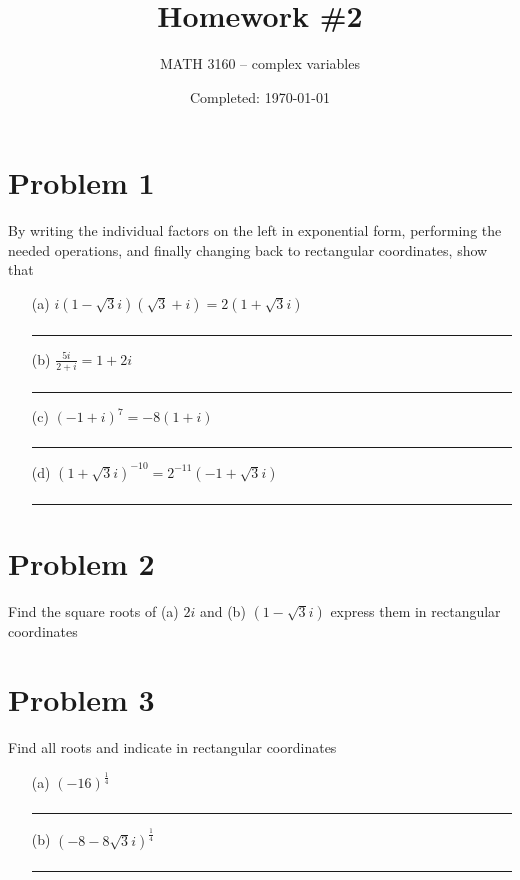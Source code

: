 \documentclass{article}
\title{Homework \#2}
\author{
  MATH 3160 -- complex variables\\
  \myauthor
}
\date{Completed: \today}
\begin{document}
\maketitle %


\section*{Problem 1}
By writing the individual factors on the left in exponential form, performing the needed
operations, and finally changing back to rectangular coordinates, show that

\begin{enumerate}
\item[(a)] $i(1-\sqrt{3}i)(\sqrt{3} + i) = 2(1 + \sqrt{3}i)$
  \begin{align*}
  \end{align*}
\hrule
\item[(b)] $\frac{5i}{2+i} = 1+2i$
  \begin{align*}
  \end{align*}
\hrule
\item[(c)] $(-1 + i)^7 = -8(1+i)$
  \begin{align*}
  \end{align*}
\hrule
\item[(d)] $(1 + \sqrt{3}i)^{-10}= 2^{-11}(-1 + \sqrt{3}i)$
  \begin{align*}
  \end{align*}
\hrule
\end{enumerate}

\vspace{.5cm} %


\newpage
\section*{Problem 2}
Find the square roots of (a) $2i$ and (b) $(1-\sqrt{3}i)$ express them in rectangular coordinates
\newpage
\section*{Problem 3}
Find all roots and indicate in rectangular coordinates
\begin{enumerate}
\item[(a)] $(-16)^{\frac{1}{4}}$
  \begin{align*}
  \end{align*}
\hrule
\item[(b)] $(-8-8\sqrt{3}i)^{\frac{1}{4}}$
  \begin{align*}
  \end{align*}
\hrule
\end{enumerate}
\end{document}
